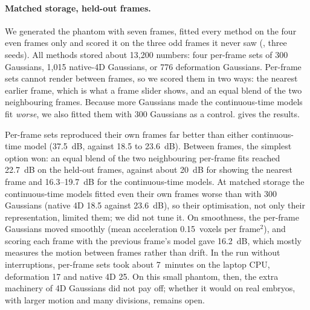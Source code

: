\documentclass[
  paper=a4,
  fontsize=11pt,
  english,
  numbers=noenddot,
  parskip=half,
  cdgeometry=symmetric,
  cd=barcolor,
  cdfont=false
]{tudscrartcl}
\begin{document}
\paragraph{Matched storage, held-out frames.} We generated the phantom with seven frames,
fitted every method on the four even frames only and scored it on the three odd frames it
never saw (, three seeds). All methods stored about 13{,}200
numbers: four per-frame sets of 300 Gaussians, 1{,}015 native-4D Gaussians, or 776 deformation
Gaussians. Per-frame sets cannot render between frames, so we scored them in two ways: the
nearest earlier frame, which is what a frame slider shows, and an equal blend of the two
neighbouring frames. Because more Gaussians made the continuous-time models fit \emph{worse}, we
also fitted them with 300 Gaussians as a control.  gives the results.

\begin{table}[tb]
  \centering\small
  
  \caption{Time-series representations on the synthetic phantom: mean PSNR on the four frames
  used for fitting and on the three held-out frames between them (mean $\pm$ standard deviation
  over three seeds). Upper block: matched storage; lower block: the continuous-time models with
  300 Gaussians.}
  \label{tab:temporal}
\end{table}

Per-frame sets reproduced their own frames far better than either continuous-time model
(\SI{37.5}{dB}, against 18.5 to \SI{23.6}{dB}). Between frames, the simplest option won: an equal
blend of the two neighbouring per-frame fits reached \SI{22.7}{dB} on the held-out frames,
against about \SI{20}{dB} for showing the nearest frame and 16.3--\SI{19.7}{dB} for the
continuous-time models. At matched storage the continuous-time models fitted even their own
frames worse than with 300 Gaussians (native 4D 18.5 against \SI{23.6}{dB}), so their
optimisation, not only their representation, limited them; we did not tune it. On smoothness,
the per-frame Gaussians moved smoothly (mean acceleration 0.15~voxels per frame$^2$), and
scoring each frame with the previous frame's model gave \SI{16.2}{dB}, which mostly measures
the motion between frames rather than drift. In the run without interruptions, per-frame sets
took about 7~minutes on the laptop CPU, deformation 17 and native 4D 25. On this small phantom, then, the extra machinery of 4D Gaussians did not pay
off; whether it would on real embryos, with larger motion and many divisions, remains open.
\end{document}
